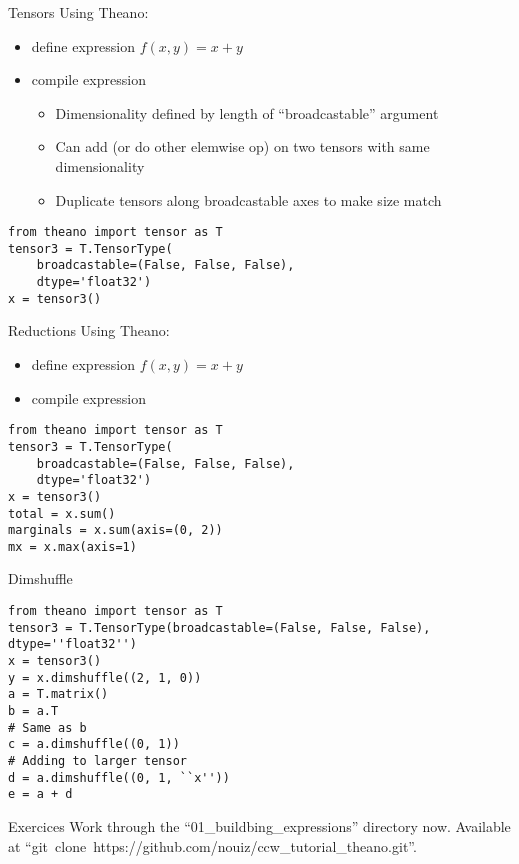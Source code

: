 \documentclass[utf8x]{beamer}
\begin{document}
\begin{frame}[fragile]{Tensors}
  Using Theano:
  \begin{itemize}
  \item define expression $f(x,y) = x + y$
  \item compile expression
    \begin{itemize}
    \item Dimensionality defined by length of ``broadcastable'' argument
    \item Can add (or do other elemwise op) on two
      tensors with same dimensionality
    \item Duplicate tensors along broadcastable axes to
      make size match
    \end{itemize}
  \end{itemize}
\begin{lstlisting}
from theano import tensor as T
tensor3 = T.TensorType(
    broadcastable=(False, False, False),
    dtype='float32')
x = tensor3()
\end{lstlisting}
\end{frame}

\begin{frame}[fragile]{Reductions}
  Using Theano:
  \begin{itemize}
  \item define expression $f(x,y) = x + y$
  \item compile expression
  \end{itemize}
\begin{lstlisting}
from theano import tensor as T
tensor3 = T.TensorType(
    broadcastable=(False, False, False),
    dtype='float32')
x = tensor3()
total = x.sum()
marginals = x.sum(axis=(0, 2))
mx = x.max(axis=1)
\end{lstlisting}
\end{frame}

\begin{frame}[fragile]{Dimshuffle}

\begin{lstlisting}
from theano import tensor as T
tensor3 = T.TensorType(broadcastable=(False, False, False), dtype=''float32'')
x = tensor3()
y = x.dimshuffle((2, 1, 0))
a = T.matrix()
b = a.T
# Same as b
c = a.dimshuffle((0, 1))
# Adding to larger tensor
d = a.dimshuffle((0, 1, ``x''))
e = a + d
\end{lstlisting}
\end{frame}

\begin{frame}{Exercices}
  Work through the ``01\_buildbing\_expressions'' directory now.
  Available at ``git~clone~https://github.com/nouiz/ccw\_tutorial\_theano.git''.
\end{frame}
\end{document}
